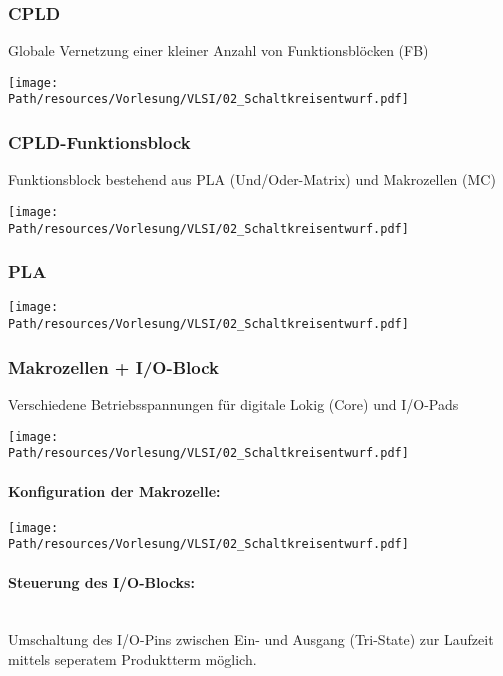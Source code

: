 	\subsubsection{CPLD}
		Globale Vernetzung einer kleiner Anzahl von Funktionsblöcken (FB)
		\begin{center}
			\texttt{[image: \\Path/resources/Vorlesung/VLSI/02\_Schaltkreisentwurf.pdf]}
		\end{center}
	\subsubsection{CPLD-Funktionsblock}
		Funktionsblock bestehend aus PLA (Und/Oder-Matrix) und Makrozellen (MC)
		\begin{center}
			\texttt{[image: \\Path/resources/Vorlesung/VLSI/02\_Schaltkreisentwurf.pdf]}
		\end{center}
	\subsubsection{PLA}
		\begin{center}
			\texttt{[image: \\Path/resources/Vorlesung/VLSI/02\_Schaltkreisentwurf.pdf]}
		\end{center}
	\subsubsection{Makrozellen + I/O-Block}
		Verschiedene Betriebsspannungen für digitale Lokig (Core) und I/O-Pads
		\begin{center}
			\texttt{[image: \\Path/resources/Vorlesung/VLSI/02\_Schaltkreisentwurf.pdf]}
		\end{center}
		\paragraph{Konfiguration der Makrozelle:}	
		\begin{center}
			\texttt{[image: \\Path/resources/Vorlesung/VLSI/02\_Schaltkreisentwurf.pdf]}
		\end{center}
		\paragraph{Steuerung des I/O-Blocks:}\hfill\\
		Umschaltung des I/O-Pins zwischen Ein- und Ausgang (Tri-State) zur Laufzeit mittels seperatem Produktterm möglich.
	
